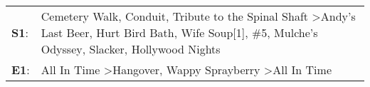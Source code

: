 \begin{supertabular}{p{0.03\textwidth}p{0.92\textwidth}}
 \textbf{S1}:  &  Cemetery Walk\textsuperscript{}, \enspace Conduit\textsuperscript{}, \enspace Tribute to the Spinal Shaft\textsuperscript{} \textgreater \enspace Andy's Last Beer\textsuperscript{}, \enspace Hurt Bird Bath\textsuperscript{}, \enspace Wife Soup[1]\textsuperscript{}, \enspace \#5\textsuperscript{}, \enspace Mulche's Odyssey\textsuperscript{}, \enspace Slacker\textsuperscript{}, \enspace Hollywood Nights\textsuperscript{}  \enspace  \\
 \textbf{E1}:  &                                                                                                                                                                                                                                                         All In Time\textsuperscript{} \textgreater \enspace Hangover\textsuperscript{}, \enspace Wappy Sprayberry\textsuperscript{} \textgreater \enspace All In Time\textsuperscript{}  \enspace  \\
\end{supertabular}
